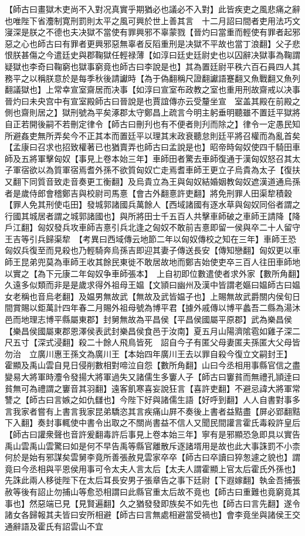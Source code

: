 【師古曰畫獄木吏尚不入對况真實乎期猶必也議必不入對】此皆疾吏之風悲痛之辭也唯陛下省灋制寛刑罰則太平之風可興於世上善其言　十二月詔曰間者吏用法巧文寖深是朕之不德也夫决獄不當使有罪興邪不辜蒙戮【晉灼曰當重而輕使有罪者起邪惡之心也師古曰有罪者更興邪惡無辜者反䧟重刑是决獄不平故也當丁浪翻】父子悲恨朕甚傷之今遣廷史與郡鞠獄任輕禄薄【如淳曰廷史廷尉史也以囚辭决獄事為鞠謂疑獄也李奇曰鞠窮也獄事窮竟也師古曰李說是也】其為置廷尉平秩六百石員四人其務平之以稱朕意於是每季秋後請讞時【為于偽翻稱尺證翻讞語蹇翻又魚戰翻又魚列翻議獄也】上常幸宣室齋居而决事【如淳曰宣室布政教之室也重用刑故齋戒以决事晉灼曰未央宫中有宣室殿師古曰晉說是也賈誼傳亦云受釐坐宣　室盖其殿在前殿之側也齋則居之】獄刑號為平矣涿郡太守鄭昌上疏言今明主躬垂明聽雖不置廷平獄將自正若開後嗣不若刪定律令【師古曰刪刋也有不便者則刋而除之】律令一定愚民知所避姦吏無所弄矣今不正其本而置廷平以理其末政衰聽怠則廷平將召權而為亂首矣【孟康曰召求也招致權著已也猶賣弄也師古曰孟說是也】昭帝時匈奴使四千騎田車師及五將軍擊匈奴【事見上卷本始三年】車師田者驚去車師復通于漢匈奴怒召其太子軍宿欲以為質軍宿焉耆外孫不欲質匈奴亡走焉耆車師王更立子烏貴為太子【復扶又翻下同質音致走音奏更工衡翻】及烏貴立為王與匈奴結婚姻教匈奴遮漢道通烏孫者是歲侍郎會稽鄭吉與校尉司馬憙【會古外翻憙許吏翻】將免刑罪人田渠犂積穀【罪人免其刑使屯田】發城郭諸國兵萬餘人【西域諸國有逐水草與匈奴同俗者謂之行國其城居者謂之城郭諸國也】與所將田士千五百人共擊車師破之車師王請降【降戶江翻】匈奴發兵攻車師吉憙引兵北逢之匈奴不敢前吉憙即留一侯與卒二十人留守王吉等引兵歸渠犂　【考異曰西域傳云地節二年以匈奴傳校之知在三年】車師王恐匈奴兵復至而見殺也乃輕騎奔烏孫吉即迎其妻子傳送長安【傳知戀翻】匈奴更以車師王昆弟兜莫為車師王收其餘民東徙不敢居故地而鄭吉始使吏卒三百人往田車師地以實之【為下元康二年匈奴争車師張本】　上自初即位數遣使者求外家【數所角翻】久遠多似類而非是是歲求得外祖母王媪【文頴曰幽州及漢中皆謂老嫗曰媪師古曰媪女老稱也音烏老翻】及媪男無故武【無故及武皆媪子也】上賜無故武爵關内侯旬日間賞賜以鉅萬計四年春二月賜外祖母號為博平君【據外戚傳以博平蠡吾二縣為湯沐邑而地理志博平縣屬東郡】封舅無故為平昌侯【平昌侯國屬平原郡】武為樂昌侯【樂昌侯國屬東郡恩澤侯表武封樂昌侯食邑于汝南】夏五月山陽濟隂雹如雞子深二尺五寸【深式浸翻】殺二十餘人飛鳥皆死　詔自今子有匿父母妻匿夫孫匿大父母皆勿治　立廣川惠王孫文為廣川王【本始四年廣川王去以罪自殺今復立文嗣封王】　霍顯及禹山雲自見日侵削數相對啼泣自怨【數所角翻】山曰今丞相用事縣官信之盡變易大將軍時灋令發揚大將軍過失又諸儒生多窶人子【師古曰窶貧而無禮孔頴逹曰貧無可為禮謂之窶音其羽翻】遠客飢寒喜妄說狂言【喜許吏翻】不避忌諱大將軍常讐之【師古曰言嫉之如仇讎也】今陛下好與諸儒生語【好呼到翻】人人自書對事多言我家者嘗有上書言我家昆弟驕恣其言疾痛山屛不奏後上書者益黠盡【屏必郢翻黠下入翻】奏封事輒使中書令出取之不關尚書益不信人又聞民間讙言霍氏毒殺許皇后【師古曰讙衆聲也音許爰翻毒許后事見上卷本始三年】寧有是邪顯恐急即具以實告禹山雲禹山雲驚曰如是何不早告禹等縣官離散斥逐諸壻用是故也此大事誅罰不小柰何於是始有邪謀矣雲舅李竟所善張赦見雲家卒卒【師古曰卒讀曰猝怱遽之貌也】謂竟曰今丞相與平恩侯用事可令太夫人言太后【太夫人謂霍顯上官太后霍氏外孫也】先誅此兩人移徙陛下在太后耳長安男子張章告之事下廷尉【下遐嫁翻】執金吾捕張赦等後有詔止勿捕山等愈恐相謂曰此縣官重太后故不竟也【師古曰重難也竟窮竟其事也】然惡端已見【見賢遍翻】久之猶發發即族矣不如先也【師古曰言先翻】遂令諸女各歸報其夫皆曰安所相避【師古曰言無處相避當受禍也】會李竟坐與諸侯王交通辭語及霍氏有詔雲山不宜